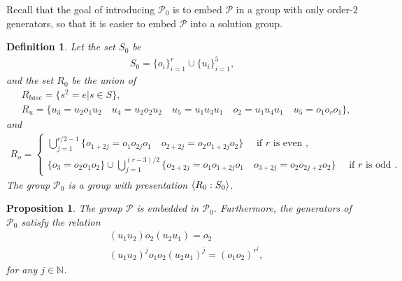 \documentclass[11pt,letterpaper]{article}
\DeclarePairedDelimiter{\ip}{\langle}{\rangle}
\newcommand{\N}{\mathbb{N}}
\newcommand{\1}{\mathbb{1}}
\newcommand{\Pg}{\mathcal{P}}
\newtheorem{proposition}[theorem]{Proposition}
\newtheorem{definition}[theorem]{Definition}
\theoremstyle{definition}
\begin{document}
Recall that the goal of introducing $\Pg_0$ is to embed
$\Pg$ in a group with only order-$2$ generators,
so that it is easier to embed $\Pg$ into a solution group.
\begin{definition}	
\label{def:g0}
	Let the set $S_0$ be 
	\begin{align*}
		S_0 = \{o_i\}_{i=1}^{r} \cup \{u_i\}_{i=1}^5,
	\end{align*}
	and the set $R_0$ be the union of 
	\begin{align*}
	&R_{base} = \{s^2 = e | s \in S\},\\
	&R_{u} = \{ u_3 = u_2o_1u_2 \quad u_4 = u_2o_2u_2 \quad 
	u_5 = u_1u_3u_1 \quad o_2 = u_1u_4u_1 \quad u_5 = o_1 o_r o_1\},
	\end{align*}
	and 
	\begin{align*}
	R_o = 
	\begin{cases} 
	\bigcup_{j=1}^{r/2-1}\{ o_{1+2j} = o_1o_{2j}o_1 \quad o_{2+2j} = o_2o_{1+2j}o_2\} \quad \text{ if $r$ is even },\\
	\{o_3 = o_2o_1o_2\} \cup \bigcup_{j=1}^{(r-3)/2}\{
	 o_{2+2j} =o_1o_{1+2j}o_1 \quad o_{3+2j} = o_2o_{2j+2}o_2 \}\quad\text{ if $r$ is odd }.
	\end{cases}
	\end{align*}
	The group $\Pg_0$ is a group with presentation $\ip{R_0:S_0}$.
\end{definition}
\begin{proposition}
    \label{prop:g0}
	The group $\Pg$ is embedded in $\Pg_0$.
	Furthermore, the generators of $\Pg_0$ satisfy the relation 
	\begin{align}
	    \label{eq:uo_comm}
	    &(u_1u_2) o_2 (u_2u_1) = o_2 \\ 
	    \label{eq:uo_rel}
		&(u_1u_2)^j o_1o_2 (u_2u_1)^j = (o_1o_2)^{r^j}, 
	\end{align}
	for any $ j \in \N$.
\end{proposition}
\end{document}
